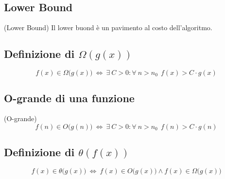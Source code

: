 \subsection{Lower Bound}
\colorbox{SALZO}{\parbox{\dimexpr\linewidth-2\fboxsep}{\begin{definition}
   (Lower Bound) Il lower buond è un pavimento al costo dell'algoritmo.
\end{definition}}}




\subsection{\texorpdfstring{Definizione di $\Omega(g(x))$}{Definizione di Omega(g(x))}}
\colorbox{SALZO}{\parbox{\dimexpr\linewidth-2\fboxsep}{\begin{definition}
  $$ f(x) \in \Omega \big( g(x) \big)\ \Leftrightarrow \ \exists \ C>0 : \forall \ n> n_0 \  \ f(x) > C \cdot g(x)$$
\end{definition}}}




\subsection{O-grande di una funzione}
\colorbox{SALZO}{\parbox{\dimexpr\linewidth-2\fboxsep}{\begin{definition}
   (O-grande)
   $$ f(n) \in O \big( g(n) \big) \ \Leftrightarrow \ \exists \ C>0: \forall\  n>n_0 \ \ f(n) >C\cdot g(n)$$
\end{definition}}}




\subsection{\texorpdfstring{Definizione di $\theta(f(x))$}{Definizione di Theta(f(x))}}
\colorbox{SALZO}{\parbox{\dimexpr\linewidth-2\fboxsep}{\begin{definition}
   $$f(x) \in \theta \big( g(x) \big) \ \Leftrightarrow \ f(x) \in O \big( g(x)\big) \wedge f(x)\in \Omega \big( g(x) \big) $$
\end{definition}}} \smallskip\\



